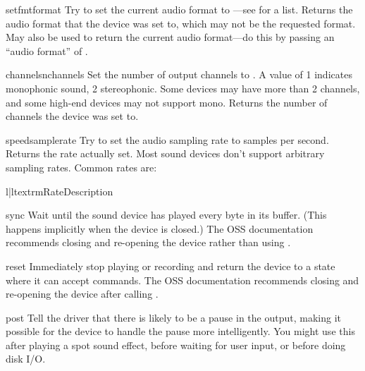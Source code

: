 \begin{methoddesc}{setfmt}{format}
Try to set the current audio format to ---see
 for a list.  Returns the audio format that the device
was set to, which may not be the requested format.  May also be used to
return the current audio format---do this by passing an ``audio format''
of
.  
\end{methoddesc}

\begin{methoddesc}{channels}{nchannels}
Set the number of output channels to .  A value of 1
indicates monophonic sound, 2 stereophonic.  Some devices may have more
than 2 channels, and some high-end devices may not support mono.
Returns the number of channels the device was set to.
\end{methoddesc}

\begin{methoddesc}{speed}{samplerate}
Try to set the audio sampling rate to  samples per
second.  Returns the rate actually set.  Most sound devices don't
support arbitrary sampling rates.  Common rates are:
\begin{tableii}{l|l}{textrm}{Rate}{Description}
\end{tableii}
\end{methoddesc}

\begin{methoddesc}{sync}{}
Wait until the sound device has played every byte in its buffer.  (This
happens implicitly when the device is closed.)  The OSS documentation
recommends closing and re-opening the device rather than using
.
\end{methoddesc}

\begin{methoddesc}{reset}{}
Immediately stop playing or recording and return the device to a
state where it can accept commands.  The OSS documentation recommends
closing and re-opening the device after calling .
\end{methoddesc}

\begin{methoddesc}{post}{}
Tell the driver that there is likely to be a pause in the output, making
it possible for the device to handle the pause more intelligently.  You
might use this after playing a spot sound effect, before waiting for
user input, or before doing disk I/O.
\end{methoddesc}

